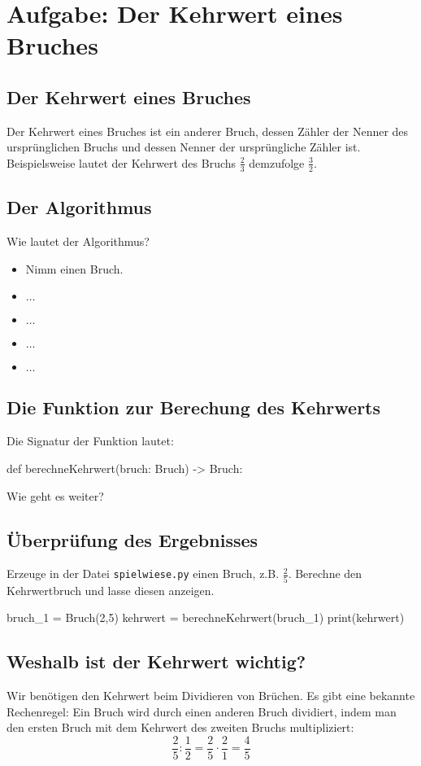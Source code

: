 \section{Aufgabe: Der Kehrwert eines Bruches}

\subsection*{Der Kehrwert eines Bruches}

Der Kehrwert eines Bruches ist ein anderer Bruch, dessen Zähler der Nenner des ursprünglichen Bruchs und dessen Nenner der ursprüngliche Zähler ist. Beispielsweise lautet der Kehrwert des Bruchs $\frac{2}{3}$ demzufolge $\frac{3}{2}$.

\subsection*{Der Algorithmus}

Wie lautet der Algorithmus?
{\Large
\begin{itemize}
	\item Nimm einen Bruch.
	\item $\dots$
	\item $\dots$
	\item $\dots$
	\item $\dots$
\end{itemize}
}

\subsection*{Die Funktion zur Berechung des Kehrwerts}

Die Signatur der Funktion lautet:

\begin{codePython}
def berechneKehrwert(bruch: Bruch) -> Bruch:
\end{codePython}

Wie geht es weiter?

\subsection*{Überprüfung des Ergebnisses}

Erzeuge in der Datei \texttt{spielwiese.py} einen Bruch, z.B. $\frac{2}{5}$. Berechne den Kehrwertbruch und lasse diesen anzeigen.

\begin{codePython}
bruch_1 = Bruch(2,5)
kehrwert = berechneKehrwert(bruch_1)
print(kehrwert)
\end{codePython}

\subsection*{Weshalb ist der Kehrwert wichtig?}

Wir benötigen den Kehrwert beim Dividieren von Brüchen. Es gibt eine bekannte Rechenregel: Ein Bruch wird durch einen anderen Bruch dividiert, indem man den ersten Bruch mit dem Kehrwert des zweiten Bruchs multipliziert:
\[
\frac{2}{5} : \frac{1}{2} = \frac{2}{5} \cdot \frac{2}{1} = \frac{4}{5}
\]

